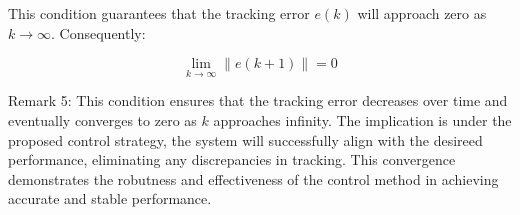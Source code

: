 \documentclass[journal,onecolumn]{IEEEtran}
\begin{document}
This condition guarantees that the tracking error \(e(k)\) will approach zero as \(k \to \infty\). Consequently:

\[
\lim_{k \to \infty} \|e(k+1)\| = 0
\]


Remark 5: This condition ensures that the tracking error decreases over time and eventually converges to zero as $k$ approaches infinity. The implication is under the proposed control strategy, the system will successfully align with the desireed performance, eliminating any discrepancies in tracking. This convergence demonstrates the robutness and effectiveness of the control method in achieving accurate and stable performance.








\end{document}
